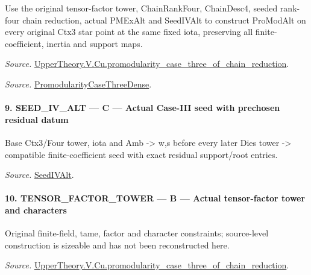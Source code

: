 \documentclass[11pt,a4paper]{article}
\numberwithin{equation}{section}
\theoremstyle{remark}\newtheorem{remark}[theorem]{Remark}
\begin{document}
Use the original tensor-factor tower, ChainRankFour, ChainDesc4, seeded rank-four chain reduction, actual PMExAlt and SeedIVAlt to construct ProModAlt on every original Ctx3 star point at the same fixed iota, preserving all finite-coefficient, inertia and support maps.

\emph{Source.} \href{https://github.com/CocoSgt/riemann-hypothesis-lean/blob/7cbf7a0c32fca1badf05931879a37c3f8a2b03b4/src/Development/AutomorphicArithmetic/AutomorphicVarieties/ModularityArgument/ThresholdArguments/DenseThresholdCases/PromodularityCaseThreeOfLemmas.lean#L131-L153}{UpperTheory.V.Cu.promodularity\_\allowbreak case\_\allowbreak three\_\allowbreak of\_\allowbreak chain\_\allowbreak reduction}.

\emph{Source.} \href{https://github.com/CocoSgt/riemann-hypothesis-lean/blob/7cbf7a0c32fca1badf05931879a37c3f8a2b03b4/src/Development/AutomorphicArithmetic/AutomorphicVarieties/ModularityArgument/ThresholdArguments/DenseThresholdCases/PromodularityCaseThree.lean#L40-L42}{PromodularityCaseThreeDense}.



\paragraph{9. SEED\_\allowbreak IV\_\allowbreak ALT — C — Actual Case-III seed with prechosen residual datum}

Base Ctx3/Four tower, iota and Amb -> w,s before every later Dies tower -> compatible finite-coefficient seed with exact residual support/root entries.

\emph{Source.} \href{https://github.com/CocoSgt/riemann-hypothesis-lean/blob/7cbf7a0c32fca1badf05931879a37c3f8a2b03b4/src/Development/AutomorphicArithmetic/AutomorphicVarieties/ModularityArgument/ThresholdArguments/DenseThresholdCases/PromodularityCaseThree.lean#L19-L25}{SeedIVAlt}.



\paragraph{10. TENSOR\_\allowbreak FACTOR\_\allowbreak TOWER — B — Actual tensor-factor tower and characters}

Original finite-field, tame, factor and character constraints; source-level construction is sizeable and has not been reconstructed here.

\emph{Source.} \href{https://github.com/CocoSgt/riemann-hypothesis-lean/blob/7cbf7a0c32fca1badf05931879a37c3f8a2b03b4/src/Development/AutomorphicArithmetic/AutomorphicVarieties/ModularityArgument/ThresholdArguments/DenseThresholdCases/PromodularityCaseThreeOfLemmas.lean#L131-L153}{UpperTheory.V.Cu.promodularity\_\allowbreak case\_\allowbreak three\_\allowbreak of\_\allowbreak chain\_\allowbreak reduction}.
\end{document}
